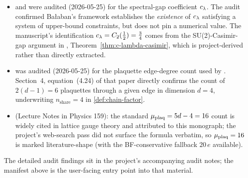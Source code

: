 \begin{itemize}
  \item {} and 
    were audited (2026-05-25) for the spectral-gap coefficient
    $c_\lambda$.  The audit confirmed Bałaban's framework
    establishes the \emph{existence} of $c_\lambda$ satisfying a
    system of upper-bound constraints, but does not pin a numerical
    value.  The manuscript's identification
    $c_\lambda = C_2(\tfrac12) = \tfrac34$ comes from the
    SU(2)-Casimir-gap argument in ,
    Theorem~\ref{thm:c-lambda-casimir}, which is project-derived
    rather than directly extracted.
  \item {} was audited
    (2026-05-25) for the plaquette edge-degree count used by
    .  Section~4, equation~(4.24)
    of that paper directly confirms the count of $2(d - 1) = 6$
    plaquettes through a given edge in dimension $d = 4$,
    underwriting $n_{\mathrm{share}} = 4$ in
    \cref{def:chain-factor}.
  \item {} (Lecture Notes in Physics 159):
    the standard $\mu_{\mathrm{plaq}} = 5d - 4 = 16$ count is widely cited in
    lattice gauge theory and attributed to this monograph; the
    project's web-search pass did not surface the formula verbatim,
    so $\mu_{\mathrm{plaq}} = 16$ is marked literature-shape (with the
    BF-conservative fallback $20\,e$ available).
\end{itemize}

The detailed audit findings sit in the project's accompanying
audit notes; the manifest above is the user-facing entry point
into that material.
